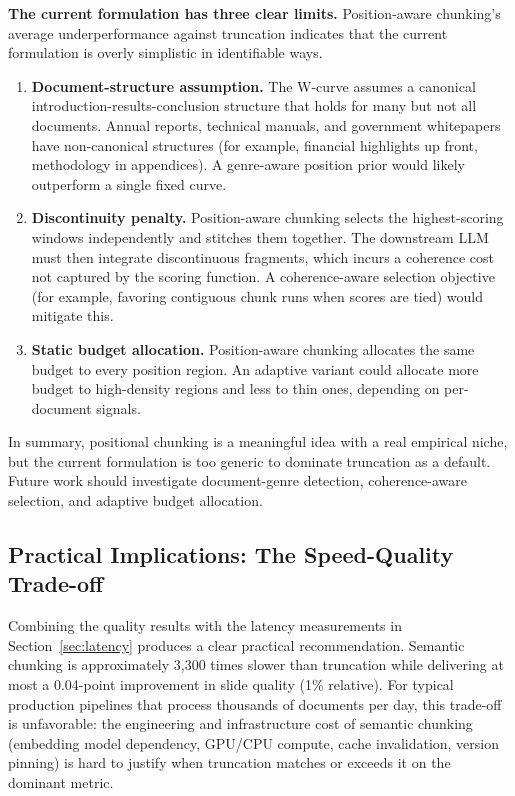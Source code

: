 \documentclass{ieeeaccess}
\begin{document}
\textbf{The current formulation has three clear limits.} Position-aware chunking's average underperformance against truncation indicates that the current formulation is overly simplistic in identifiable ways.
\begin{enumerate}
    \item \textbf{Document-structure assumption.} The W-curve assumes a canonical introduction-results-conclusion structure that holds for many but not all documents. Annual reports, technical manuals, and government whitepapers have non-canonical structures (for example, financial highlights up front, methodology in appendices). A genre-aware position prior would likely outperform a single fixed curve.
    \item \textbf{Discontinuity penalty.} Position-aware chunking selects the highest-scoring windows independently and stitches them together. The downstream LLM must then integrate discontinuous fragments, which incurs a coherence cost not captured by the scoring function. A coherence-aware selection objective (for example, favoring contiguous chunk runs when scores are tied) would mitigate this.
    \item \textbf{Static budget allocation.} Position-aware chunking allocates the same budget to every position region. An adaptive variant could allocate more budget to high-density regions and less to thin ones, depending on per-document signals.
\end{enumerate}

In summary, positional chunking is a meaningful idea with a real empirical niche, but the current formulation is too generic to dominate truncation as a default. Future work should investigate document-genre detection, coherence-aware selection, and adaptive budget allocation.

\subsection{Practical Implications: The Speed-Quality Trade-off}
\label{sec:speed-discussion}

Combining the quality results with the latency measurements in Section~\ref{sec:latency} produces a clear practical recommendation. Semantic chunking is approximately 3,300 times slower than truncation while delivering at most a 0.04-point improvement in slide quality (1\% relative). For typical production pipelines that process thousands of documents per day, this trade-off is unfavorable: the engineering and infrastructure cost of semantic chunking (embedding model dependency, GPU/CPU compute, cache invalidation, version pinning) is hard to justify when truncation matches or exceeds it on the dominant metric.
\end{document}
